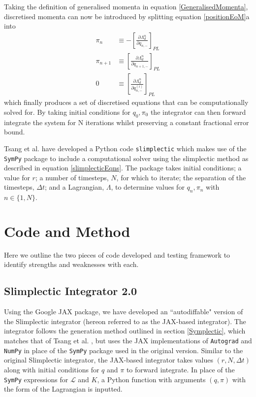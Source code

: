 \documentclass[10pt]{iopart}
\begin{document}
Taking the definition of generalised momenta in equation \ref{GeneralisedMomenta}, discretised momenta can now be introduced by splitting equation \ref{positionEoM}a into 
\begin{subequations}
\label{slimplecticEqns}
\begin{align}
\pi_n &\equiv -\left[\frac{\partial\Lambda_d^n}{\partial q_{n,-}}\right]_{PL} \\
\pi_{n+1} &\equiv \left[\frac{\partial\Lambda_d^n}{\partial q_{n+1,-}}\right]_{PL} \\ 
0 &\equiv \left[\frac{\partial\Lambda_d^n}{\partial q_{n,-}^{(i)}}\right]_{PL}
\end{align}
\end{subequations}
which finally produces a set of discretised equations that can be computationally solved for. By taking initial conditions for $q_0, \pi_0$ the integrator can then forward integrate the system for N iterations whilst preserving a constant fractional error bound.

Tsang et al. \cite{Tsang_Slimplectic} have developed a Python code \texttt{slimplectic} which makes use of the \texttt{SymPy} package to include a computational solver using the slimplectic method as described in equation \ref{slimplecticEqns}. The package takes initial conditions; a value for $r$; a number of timesteps, $N$, for which to iterate; the separation of the timesteps, $\Delta t$; and a Lagrangian, $\Lambda$, to determine values for $q_n,\pi_n$ with $n\in\{1,N\}$.

\section{Code and Method}
Here we outline the two pieces of code developed and testing framework to identify strengths and weaknesses with each. 
\subsection{Slimplectic Integrator 2.0}
\label{SI2.0}
Using the Google JAX package, we have developed an ``autodiffable" version of the Slimplectic integrator (hereon referred to as the JAX-based integrator). The integrator follows the generation method outlined in section \ref{Symplectic}, which matches that of Tsang et al. \cite{Tsang_Slimplectic}, but uses the JAX implementations of \texttt{Autograd} and \texttt{NumPy} in place of the \texttt{SymPy} package used in the original version. Similar to the original Slimplectic integrator, the JAX-based integrator takes values $(r, N, \Delta t)$ along with initial conditions for $q$ and $\pi$ to forward integrate. In place of the \texttt{SymPy} expressions for $\mathcal L$ and $K$, a Python function with arguments $(q,\pi)$ with the form of the Lagrangian is inputted. 
\end{document}
